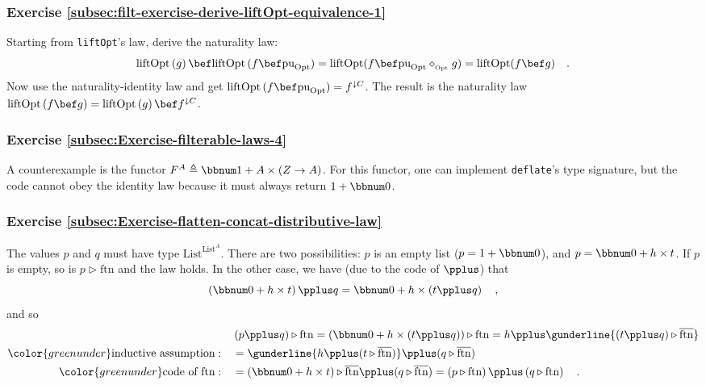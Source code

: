 \subsubsection*{Exercise \ref{subsec:filt-exercise-derive-liftOpt-equivalence-1}}

Starting from \lstinline!liftOpt!\textsf{'}s law, derive the naturality law:
\[
\text{liftOpt}\left(g\right)\bef\text{liftOpt}\,(f\bef\text{pu}_{\text{Opt}})=\text{liftOpt}(f\bef\text{pu}_{\text{Opt}}\diamond_{_{\text{Opt}}}g)=\text{liftOpt}(f\bef g)\quad.
\]
Now use the naturality-identity law and get $\text{liftOpt}\,(f\bef\text{pu}_{\text{Opt}})=f^{\downarrow C}$.
The result is the naturality law $\text{liftOpt}\left(f\bef g\right)=\text{liftOpt}\left(g\right)\bef f^{\downarrow C}$.

\subsubsection*{Exercise \ref{subsec:Exercise-filterable-laws-4}}

A counterexample is the functor $F^{A}\triangleq\bbnum 1+A\times\left(Z\rightarrow A\right)$.
For this functor, one can implement \lstinline!deflate!\textsf{'}s type signature,
but the code cannot obey the identity law because it must always return
$1+\bbnum 0$.

\subsubsection*{Exercise \ref{subsec:Exercise-flatten-concat-distributive-law}}

The values $p$ and $q$ must have type $\text{List}^{\text{List}^{A}}$.
There are two possibilities: $p$ is an empty list ($p=1+\bbnum 0$),
and $p=\bbnum 0+h\times t$. If $p$ is empty, so is $p\triangleright\text{ftn}$
and the law holds. In the other case, we have (due to the code of
$\pplus$) that
\[
\left(\bbnum 0+h\times t\right)\pplus q=\bbnum 0+h\times\left(t\pplus q\right)\quad,
\]
and so
\begin{align*}
 & \left(p\pplus q\right)\triangleright\text{ftn}=\left(\bbnum 0+h\times\left(t\pplus q\right)\right)\triangleright\text{ftn}=h\pplus\gunderline{\left(t\pplus q\right)\triangleright\overline{\text{ftn}}}\\
{\color{greenunder}\text{inductive assumption}:}\quad & =\gunderline{h\pplus(t\triangleright\overline{\text{ftn}})}\pplus(q\triangleright\overline{\text{ftn}})\\
{\color{greenunder}\text{code of }\text{ftn}:}\quad & =\left(\bbnum 0+h\times t\right)\triangleright\overline{\text{ftn}}\pplus(q\triangleright\overline{\text{ftn}})=\left(p\triangleright\text{ftn}\right)\pplus\left(q\triangleright\text{ftn}\right)\quad.
\end{align*}


